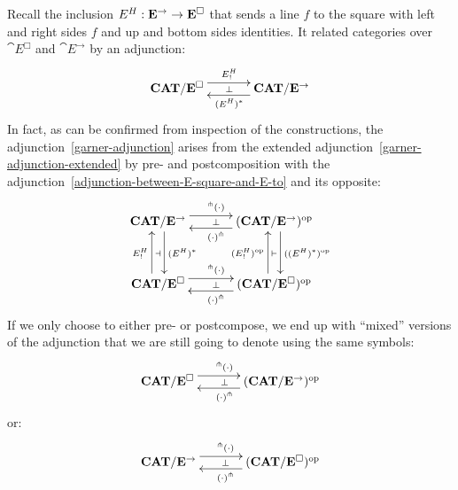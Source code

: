 \documentclass[reqno,10pt,a4paper,oneside]{amsart}
\begin{document}
\begin{remark}
\label{extended-adjunction-gives-normal-one}
Recall the inclusion $E{}^{H} : \mathbf{E}^{\to} \to \mathbf{E}^{\Box}$ that sends a line $f$ to the square with left and right sides $f$ and up and bottom sides identities.
It related categories over $\cat{E}^{\Box}$ and $\cat{E}^{\to}$ by an adjunction:
\begin{equation}
\label{adjunction-between-E-square-and-E-to}
\begin{gathered}
\xymatrix@C+1em{
  \CAT/\cat{E}^{\Box}
  \ar@<5pt>[r]^{E\sqhori_!}
  \ar@{}[r]|{\bot}
&
  \CAT/\cat{E}^{\to}
  \ar@<5pt>[l]^{(E\sqhori)^*}
}
\end{gathered}
\end{equation}
In fact, as can be confirmed from inspection of the constructions, the adjunction~\eqref{garner-adjunction} arises from the extended adjunction~\eqref{garner-adjunction-extended} by pre- and postcomposition with the adjunction~\eqref{adjunction-between-E-square-and-E-to} and its opposite:
\begin{equation*}
\begin{gathered}
\xymatrix@R+1em@C+1em{
  \CAT/\cat{E}^{\to}
  \ar@<5pt>[r]^{^{\pitchfork}(\arghole)}
  \ar@{}[r]|{\bot}
  \ar@<5pt>[d]^{(E\sqhori)^*}
  \ar@{}[d]|{\dashv}
&
  (\CAT/\cat{E}^{\to})^{\op}
  \ar@<5pt>[l]^{(\arghole)^{\pitchfork}}
  \ar@<5pt>[d]^{((E\sqhori)^*)^{\op}}
  \ar@{}[d]|{\vdash}
\\
  \CAT/\cat{E}^{\Box}
  \ar@<5pt>[r]^{^{\pitchfork}(\arghole)}
  \ar@{}[r]|{\bot}
  \ar@<5pt>[u]^{E\sqhori_!}
&
  (\CAT/\cat{E}^{\Box})^{\op}
  \ar@<5pt>[l]^{(\arghole)^{\pitchfork}}
  \ar@<5pt>[u]^{(E\sqhori_!)^{\op}}
}
\end{gathered}
\end{equation*}
If we only choose to either pre- or postcompose, we end up with ``mixed'' versions of the adjunction that we are still going to denote using the same symbols:
\begin{equation}
\label{garner-adjunction-extended-mixed}
\begin{gathered}
\xymatrix@C+1em{
  \CAT/\cat{E}^{\Box}
  \ar@<5pt>[r]^{^{\pitchfork}(\arghole)}
  \ar@{}[r]|{\bot}
&
  (\CAT/\cat{E}^{\to})^{\op}
  \ar@<5pt>[l]^{(\arghole)^{\pitchfork}}
}
\end{gathered}
\end{equation}
or:
\begin{equation}
\label{garner-adjunction-extended-mixed'}
\begin{gathered}
\xymatrix@C+1em{
  \CAT/\cat{E}^{\to}
  \ar@<5pt>[r]^{^{\pitchfork}(\arghole)}
  \ar@{}[r]|{\bot}
&
  (\CAT/\cat{E}^{\Box})^{\op}
  \ar@<5pt>[l]^{(\arghole)^{\pitchfork}}
}
\end{gathered}
\end{equation}
\end{remark}
\end{document}
